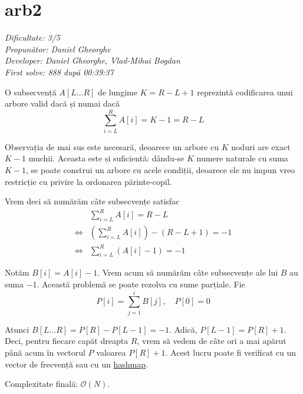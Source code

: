 \section{arb2}
\textit{Dificultate: 3/5} \\
\textit{Propunător: Daniel Gheorghe} \\
\textit{Developer: Daniel Gheorghe, Vlad-Mihai Bogdan} \\
\textit{First solve: 888 după 00:39:37}  \\

\begin{remark}
    O subsecvență $A[L\dots R]$ de lungime $K = R - L + 1$ reprezintă codificarea unui arbore valid dacă și numai dacă 
    \[
	\sum_{i=L}^{R} A[i] = K - 1 = R - L
    \]
\end{remark}

Observația de mai sus este necesară, deoarece un arbore cu $K$ noduri are exact $K - 1$ muchii. Aceasta este și suficientă: dându-se $K$ numere naturale cu suma $K - 1$, se poate construi un arbore cu acele condiții, deoarece ele nu impun vreo restricție cu privire la ordonarea părinte-copil.

\medskip

Vrem deci să numărăm câte subsecvențe satisfac
\begin{align*}
    & \sum_{i = L}^{R} A[i] = R - L \\
    \iff & (\sum_{i = L}^{R} A[i]) - (R - L + 1) = -1 \\
    \iff & \sum_{i = L}^{R} (A[i] - 1) = -1
\end{align*}

Notăm $B[i] = A[i] - 1$. Vrem acum să numărăm câte subsecvențe ale lui $B$ au suma $-1$. Această problemă se poate rezolva cu sume parțiale. Fie 
\[
    P[i] = \sum_{j = 1}^{i} B[j], \quad P[0] = 0
\]

Atunci $B[L\dots R] = P[R] - P[L - 1] = -1$. Adică, $P[L - 1] = P[R] + 1$. Deci, pentru fiecare capăt dreapta $R$, vrem să vedem de câte ori a mai apărut până acum în vectorul $P$ valoarea $P[R] + 1$. Acest lucru poate fi verificat cu un vector de frecvență sau cu un \href{https://www.geeksforgeeks.org/cpp/how-to-use-hashmap-in-cpp/}{hashmap}.

\medskip

Complexitate finală: $\mathcal{O}(N)$.
